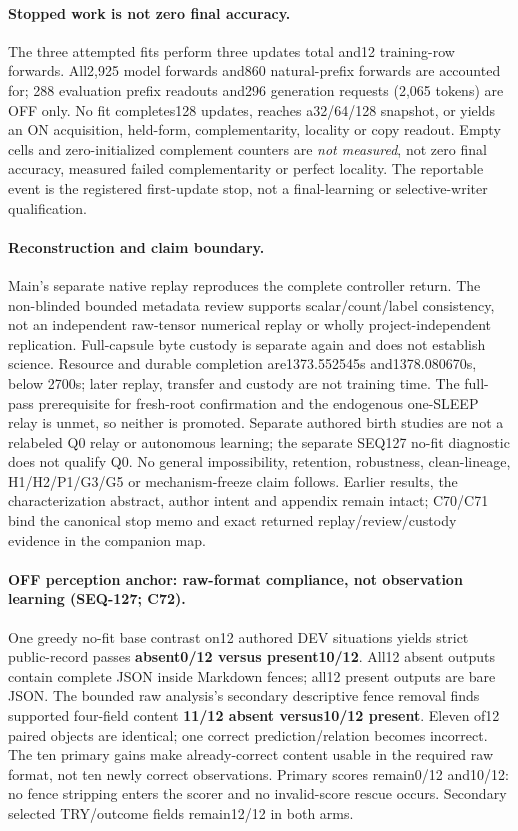 \documentclass{article}
\begin{document}
\paragraph{Stopped work is not zero final accuracy.}
The three attempted fits perform three updates total and12 training-row forwards.
All2,925 model forwards and860 natural-prefix forwards are accounted for;
288 evaluation prefix readouts and296 generation requests (2,065 tokens) are
OFF only. No fit completes128 updates, reaches a32/64/128 snapshot, or yields
an ON acquisition, held-form, complementarity, locality or copy readout. Empty
cells and zero-initialized complement counters are \emph{not measured}, not
zero final accuracy, measured failed complementarity or perfect locality.
The reportable event is the registered first-update stop, not a final-learning
or selective-writer qualification.

\paragraph{Reconstruction and claim boundary.}
Main's separate native replay reproduces the complete controller return. The
non-blinded bounded metadata review supports scalar/count/label consistency,
not an independent raw-tensor numerical replay or wholly project-independent
replication. Full-capsule byte custody is separate again and does not establish
science. Resource and durable completion are1373.552545s and1378.080670s, below
2700s; later replay, transfer and custody are not training time. The full-pass
prerequisite for fresh-root confirmation and the endogenous one-SLEEP relay is
unmet, so neither is promoted. Separate authored birth studies are not a
relabeled Q0 relay or autonomous learning; the separate SEQ127 no-fit diagnostic
does not qualify Q0.
No general impossibility, retention, robustness, clean-lineage, H1/H2/P1/G3/G5
or mechanism-freeze claim follows. Earlier results, the characterization
abstract, author intent and appendix remain intact; C70/C71 bind the canonical
stop memo and exact returned replay/review/custody evidence in the companion map.

\paragraph{OFF perception anchor: raw-format compliance, not observation learning (SEQ-127; C72).}
One greedy no-fit base contrast on12 authored DEV situations yields strict
public-record passes \textbf{absent0/12 versus present10/12}. All12 absent
outputs contain complete JSON inside Markdown fences; all12 present outputs
are bare JSON. The bounded raw analysis's secondary descriptive fence removal
finds supported four-field content \textbf{11/12 absent versus10/12 present}.
Eleven of12 paired objects are identical; one correct prediction/relation
becomes incorrect. The ten primary gains make already-correct content usable
in the required raw format, not ten newly correct observations. Primary scores
remain0/12 and10/12: no fence stripping enters the scorer and no invalid-score
rescue occurs. Secondary selected TRY/outcome fields remain12/12 in both arms.
\end{document}
